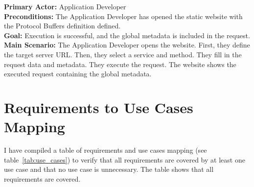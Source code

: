 
\textbf{Primary Actor:} Application Developer\\
\textbf{Preconditions:} The Application Developer has opened the static website with the Protocol Buffers definition defined.\\
\textbf{Goal:} Execution is successful, and the global metadata is included in the request.\\
\textbf{Main Scenario:}
The Application Developer opens the website.
First, they define the target server URL\@.
Then, they select a service and method.
They fill in the request data and metadata.
They execute the request.
The website shows the executed request containing the global metadata.


\section{Requirements to Use Cases Mapping}
I have compiled a table of requirements and use cases mapping (see table~\ref{tab:use_cases}) to verify that all requirements are covered by at least one use case and that no use case is unnecessary.
The table shows that all requirements are covered.


